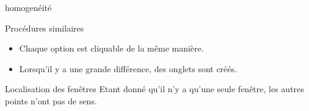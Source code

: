 \begin{frame}{homogenéité}
  \begin{block}{Procédures similaires}
    \begin{itemize}
    \item Chaque option est cliquable de la même manière.
    \item Lorsqu'il y a une grande différence, des onglets sont créés.
    \end{itemize}
  \end{block}
  \begin{block}{Localisation des fenêtres}
    Etant donné qu'il n'y a qu'une seule fenêtre, les autres points
    n'ont pas de sens.
  \end{block}

\end{frame}
